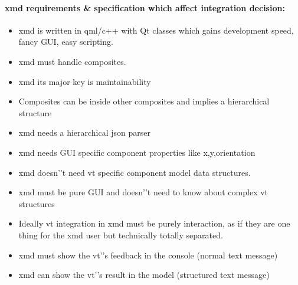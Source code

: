 \documentclass[a4paper,11pt,final]{article}
\begin{document}
\paragraph{xmd requirements \& specification which affect integration decision:}
\begin{itemize}
\item xmd is written in qml/c++ with Qt classes which gains development speed, fancy GUI, easy scripting.
\item xmd must handle composites.
\item xmd its major key is maintainability
\item Composites can be inside other composites and implies a hierarchical structure
\item xmd needs a hierarchical json parser
\item xmd needs GUI specific component properties like x,y,orientation
\item xmd doesn'’t need vt specific component model data structures.
\item xmd must be pure GUI and doesn'’t need to know about complex vt structures
\item Ideally vt integration in xmd must be purely interaction,  as if they are one thing for the xmd user but technically totally separated.
\item xmd must show the vt'’s feedback in the console (normal text message)
\item xmd can show the vt'’s result in the model (structured text message)
\end{itemize}
\end{document}
